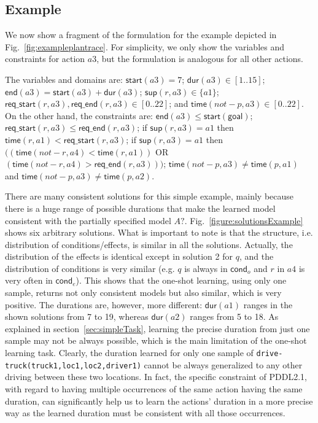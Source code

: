 \documentclass[runningheads]{llncs}
\newcommand{\cond}{\mathsf{cond}}  %
\newcommand{\dur}{\mathsf{dur}}    %
\newcommand{\start}{\mathsf{start}}%
\newcommand{\en}{\mathsf{end}}     %
\newcommand{\supp}{\mathsf{sup}}   %
\newcommand{\tim}{\mathsf{time}}   %
\newcommand{\reqs}{\mathsf{req\_{start}}} %
\newcommand{\reqe}{\mathsf{req\_{end}}}   %
\newcommand{\goal}{\mathsf{goal}}  %
\begin{document}
\subsection{Example}
\label{sec:example}

We now show a fragment of the formulation for the example depicted in Fig.~\ref{fig:exampleplantrace}. For simplicity, we only show the variables and constraints for action $a3$, but the formulation is analogous for all other actions.

The variables and domains are: $\start(a3)=7$; $\dur(a3) \in [1..15]$; $\en(a3)=\start(a3)+\dur(a3)$; $\supp(r,a3) \in \{a1\}$; $\reqs(r,a3),\reqe(r,a3) \in [0..22]$; and $\tim(not-p,a3) \in [0..22]$.
On the other hand, the constraints are: $\en(a3) \leq \start(\goal)$; $\reqs(r,a3) \leq \reqe(r,a3)$; if $\supp(r,a3)=a1$ then $\tim(r,a1) < \reqs(r,a3)$; if $\supp(r,a3)=a1$ then $((\tim(not-r,a4) < \tim(r,a1))$ OR $(\tim(not-r,a4) > \reqe(r,a3)))$; $\tim(not-p,a3) \neq \tim(p,a1)$ and $\tim(not-p,a3) \neq \tim(p,a2)$.

There are many consistent solutions for this simple example, mainly because there is a huge range of possible durations that make the learned model consistent with the partially specified model $A?$.
Fig.~\ref{figure:solutionsExample} shows six arbitrary solutions. What is important to note is that the structure, i.e. distribution of conditions/effects, is similar in all the solutions. Actually, the distribution of the effects is identical except in solution 2 for $q$, and the distribution of conditions is very similar (e.g. $q$ is always in $\cond_o$ and $r$ in $a4$ is very often in $\cond_e$).
This shows that the one-shot learning, using only one sample, returns not only consistent models but also similar, which is very positive.
The durations are, however, more different: $\dur(a1)$ ranges in the shown solutions from 7 to 19, whereas $\dur(a2)$ ranges from 5 to 18. As explained in section~\ref{sec:simpleTask}, learning the precise duration from just one sample may not be always possible, which is the main limitation of the one-shot learning task.
Clearly, the duration learned for only one sample of \texttt{drive-truck(truck1,loc1,loc2,driver1)} cannot be always generalized to any other driving between these two locations.
In fact, the specific constraint of PDDL2.1, with regard to having multiple occurrences of the same action having the same duration, can significantly help us to learn the actions' duration in a more precise way as the learned duration must be consistent with all those occurrences.
\end{document}
